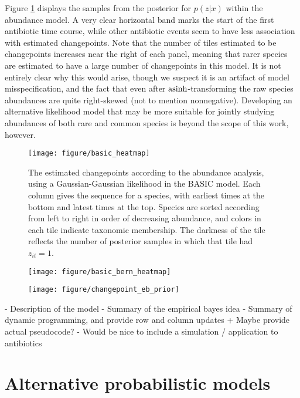 \documentclass{article}
\begin{document}
Figure \ref{fig:basic_heatmap} displays the samples from the posterior for
$p\left(z \vert x\right)$ within the abundance model. A very clear horizontal
band marks the start of the first antibiotic time course, while other antibiotic
events seem to have less association with estimated changepoints. Note that the
number of tiles estimated to be changepoints increases near the right of each
panel, meaning that rarer species are estimated to have a large number of
changepoints in this model. It is not entirely clear why this would arise,
though we suspect it is an artifact of model misspecification, and the fact that
even after $\mathop\mathrm{asinh}$-transforming the raw species abundances are quite
right-skewed (not to mention nonnegative). Developing an alternative likelihood
model that may be more suitable for jointly studying abundances of both rare and
common species is beyond the scope of this work, however.

\begin{figure}[ht]
  \centering
  \texttt{[image: figure/basic\_heatmap]}
  \caption{The estimated changepoints according to the abundance analysis, using
    a Gaussian-Gaussian likelihood in the BASIC model. Each column gives the
    sequence for a species, with earliest times at the bottom and latest times
    at the top. Species are sorted according from left to right in order of
    decreasing abundance, and colors in each tile indicate taxonomic membership.
    The darkness of the tile reflects the number of posterior samples in which
    that tile had $z_{it} = 1$.
    \label{fig:basic_heatmap} }
\end{figure}

\begin{figure}[ht]
  \centering
  \texttt{[image: figure/basic\_bern\_heatmap]}
  \caption{\label{fig:basic_bern_heatmap} }
\end{figure}

\begin{figure}[ht]
  \centering
  \texttt{[image: figure/changepoint\_eb\_prior]}
  \caption{\label{fig:changepoint_eb_prior} }
\end{figure}

- Description of the model
- Summary of the empirical bayes idea
- Summary of dynamic programming, and provide row and column updates
  + Maybe provide actual pseudocode?
- Would be nice to include a simulation / application to antibiotics

\section{Alternative probabilistic models}
\label{sec:alternative_probabilistic_models}
\end{document}
